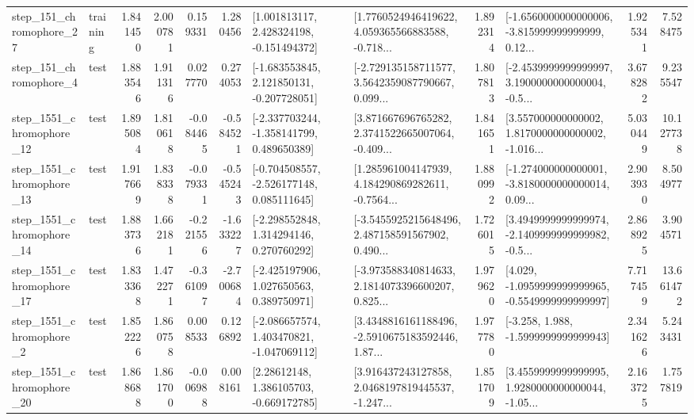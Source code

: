 \begin{tabular}{llrrrrllrlrr}
  step\_151\_chromophore\_27 &  training &      1.841450 &    2.000781 &      0.159331 &  1.280456 &    [1.001813117, 2.428324198, -0.151494372] &  [1.7760524946419622, 4.059365566883588, -0.718... &       1.892314 &  [-1.6560000000000006, -3.815999999999999, 0.12... &            1.925341 &          7.528475 \\
   step\_151\_chromophore\_4 &      test &      1.883546 &    1.911316 &      0.027770 &  0.274053 &   [-1.683553845, 2.121850131, -0.207728051] &  [-2.729135158711577, 3.5642359087790667, 0.099... &       1.807813 &  [-2.4539999999999997, 3.1900000000000004, -0.5... &            3.678282 &          9.235547 \\
 step\_1551\_chromophore\_12 &      test &      1.895084 &    1.810618 &     -0.084465 & -0.584521 &   [-2.337703244, -1.358141799, 0.489650389] &  [3.871667696765282, 2.3741522665007064, -0.409... &       1.841651 &  [3.557000000000002, 1.8170000000000002, -1.016... &            5.030449 &         10.127738 \\
 step\_1551\_chromophore\_13 &      test &      1.917669 &    1.838338 &     -0.079331 & -0.545243 &   [-0.704508557, -2.526177148, 0.085111645] &  [1.285961004147939, 4.184290869282611, -0.7564... &       1.880992 &  [-1.274000000000001, -3.8180000000000014, 0.09... &            2.903930 &          8.504977 \\
 step\_1551\_chromophore\_14 &      test &      1.883736 &    1.662181 &     -0.221556 & -1.633227 &    [-2.298552848, 1.314294146, 0.270760292] &  [-3.5455925215648496, 2.487158591567902, 0.490... &       1.726015 &  [3.4949999999999974, -2.1409999999999982, -0.5... &            2.868925 &          3.904571 \\
 step\_1551\_chromophore\_17 &      test &      1.833368 &    1.472271 &     -0.361097 & -2.700684 &    [-2.425197906, 1.027650563, 0.389750971] &  [-3.973588340814633, 2.1814073396600207, 0.825... &       1.979620 &  [4.029, -1.0959999999999965, -0.5549999999999997] &            7.717459 &         13.661472 \\
  step\_1551\_chromophore\_2 &      test &      1.852226 &    1.860758 &      0.008533 &  0.126892 &   [-2.086657574, 1.403470821, -1.047069112] &  [3.4348816161188496, -2.5910675183592446, 1.87... &       1.977780 &               [-3.258, 1.988, -1.5999999999999943] &            2.341626 &          5.243431 \\
 step\_1551\_chromophore\_20 &      test &      1.868688 &    1.861700 &     -0.006988 &  0.008161 &     [2.28612148, 1.386105703, -0.669172785] &  [3.916437243127858, 2.0468197819445537, -1.247... &       1.851709 &  [3.4559999999999995, 1.9280000000000044, -1.05... &            2.163725 &          1.757819 \\

\end{tabular}
